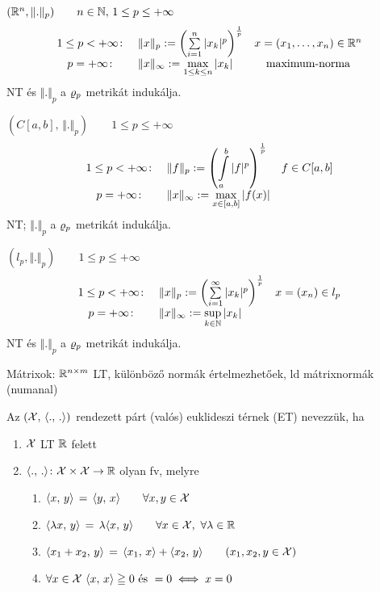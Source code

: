 \begin{Pl}
\item $(\mathbb{R}^n,\Vert.\Vert_p)\qquad n\in \mathbb{N},\, 1\leq p \leq
  +\infty$
  \[\displaystyle\begin{array}{clc}
  1\leq p < +\infty\colon & \Vert x \Vert_p := \left(\sum\limits_{i=1}^n
  |x_k|^p\right)^\frac1{p} & x=(x_1,\ldots,x_n)\in \mathbb{R}^n\\
  p=+\infty\colon &\Vert x \Vert_\infty := \max\limits_{1\leq
    k\leq n} |x_k|& \text{maximum-norma}\end{array}\]
  NT és $\Vert.\Vert_p$ a $\varrho_p$ metrikát indukálja.

\item  $(C[a,b],\, \Vert.\Vert_p)\qquad 1\leq p\leq+\infty$
  \[\displaystyle\begin{array}{clc}
  1\leq p < +\infty\colon & \Vert f \Vert_p := \left(\displaystyle\int\limits_a^b
  \vert f\vert^p\right)^\frac1{p} & f \in C[a,b]\\
  p=+\infty\colon &\Vert x \Vert_\infty := \max\limits_{x\in
    [a,b]} \vert f(x)\vert & \end{array}\]
  NT; $\Vert.\Vert_p$ a $\varrho_p$ metrikát indukálja.

\item $(l_p,\Vert.\Vert_p)\qquad 1\leq p \leq
  +\infty$
  \[\displaystyle\begin{array}{clc}
  1\leq p < +\infty\colon & \Vert x \Vert_p := \left(\sum\limits_{i=1}^\infty
  |x_k|^p\right)^\frac1{p} & x=(x_n)\in l_p\\
  p=+\infty\colon &\Vert x \Vert_\infty := \sup\limits_{k\in\mathbb{N}} 
  |x_k|& \end{array}\]
  NT és $\Vert.\Vert_p$ a $\varrho_p$ metrikát indukálja.
\item Mátrixok: $\mathbb{R}^{n\times m}$ LT, különböző normák
  értelmezhetőek, ld mátrixnormák (numanal)
\end{Pl}



\begin{de}
  Az $(\mathcal{X},\,\langle.,\,.\rangle)$ rendezett párt (valós) euklideszi térnek (ET) nevezzük, ha
  \begin{enumerate}
  \item $\mathcal{X}$ LT $\mathbb{R}$ felett
  \item $\langle.,\,.\rangle\colon\mathcal{X}\times\mathcal{X}\to\mathbb{R}$ olyan fv, melyre
    \begin{enumerate}
    \item $\langle x,\,y\rangle \,=\,\langle y,\,x\rangle\qquad \forall x,y\in\mathcal{X}$
    \item $\skalar{\lambda x} y \,=\,\lambda\skalar x y\qquad \forall x\in\X,\ \forall\lambda\in\R$
    \item $\langle x_1+x_2,\,y\rangle \,=\,\langle x_1,\,x\rangle + \langle x_2,\,y\rangle \qquad (x_1,x_2,y\in\mathcal{X})$
    \item $\forall x\in\mathcal{X}\ \langle x,\,x\rangle \geqq0 \text{ és } =0\iff x=0$
    \end{enumerate}
  \end{enumerate}
\end{de}


